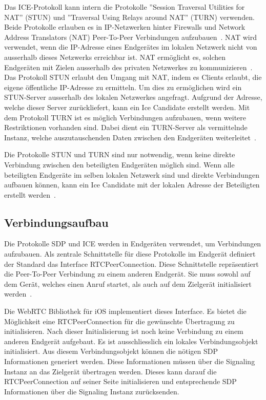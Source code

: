 Das ICE-Protokoll kann intern die Protokolle ''Session Traversal Utilities for NAT'' (STUN) und ''Traversal Using Relays around NAT'' (TURN) verwenden.
Beide Protokolle erlauben es in IP-Netzwerken hinter Firewalls und Network Address Translators (NAT) Peer-To-Peer Verbindungen aufzubauen~\cite{rfc_8445_ice}.
NAT wird verwendet, wenn die IP-Adresse eines Endgerätes im lokalen Netzwerk nicht von ausserhalb dieses Netzwerks erreichbar ist.
NAT ermöglicht es, solchen Endgeräten mit Zielen ausserhalb des privaten Netzwerkes zu kommunizieren~\cite{rfc_2663_nat}.
Das Protokoll STUN erlaubt den Umgang mit NAT, indem es Clients erlaubt, die eigene öffentliche IP-Adresse zu ermitteln.
Um dies zu ermöglichen wird ein STUN-Server ausserhalb des lokalen Netzwerkes angefragt.
Aufgrund der Adresse, welche dieser Server zurückliefert, kann ein Ice Candidate erstellt werden\cite{rfc_8445_ice}.
Mit dem Protokoll TURN ist es möglich Verbindungen aufzubauen, wenn weitere Restriktionen vorhanden sind.
Dabei dient ein TURN-Server als vermittelnde Instanz, welche auszutauschenden Daten zwischen den Endgeräten weiterleitet~\cite{webRTC_TURN}.

Die Protokolle STUN und TURN sind nur notwendig, wenn keine direkte Verbindung zwischen den beteiligten Endgeräten möglich sind.
Wenn alle beteiligten Endgeräte im selben lokalen Netzwerk sind und direkte Verbindungen aufbauen können, kann ein Ice Candidate mit der lokalen Adresse der Beteiligten erstellt werden~\cite{webRTC_TURN}.

\subsection{Verbindungsaufbau}

Die Protokolle SDP und ICE werden in Endgeräten verwendet, um Verbindungen aufzubauen.
Als zentrale Schnittstelle für diese Protokolle im Endgerät definiert der Standard das Interface RTCPeerConnection.
Diese Schnittstelle repräsentiert die Peer-To-Peer Verbindung zu einem anderen Endgerät.
Sie muss sowohl auf dem Gerät, welches einen Anruf startet, als auch auf dem Zielgerät initialisiert werden~\cite{webrtc_spec}.

Die WebRTC Bibliothek für iOS implementiert dieses Interface.
Es bietet die Möglichkeit eine RTCPeerConnection für die gewünschte Übertragung zu initialisieren.
Nach dieser Initialisierung ist noch keine Verbindung zu einem anderen Endgerät aufgebaut.
Es ist ausschliesslich ein lokales Verbindungsobjekt initialisiert.
Aus diesem Verbindungsobjekt können die nötigen SDP Informationen generiert werden.
Diese Informationen müssen über die Signaling Instanz an das Zielgerät übertragen werden.
Dieses kann darauf die RTCPeerConnection auf seiner Seite initialisieren und entsprechende SDP Informationen über die Signaling Instanz zurücksenden.

